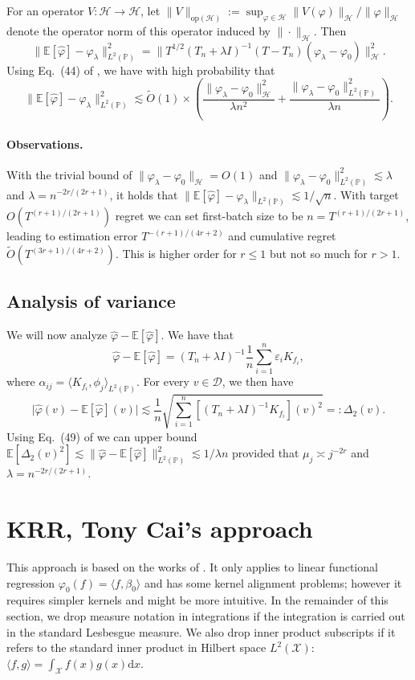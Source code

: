\documentclass[11pt,a4paper]{article}
\renewcommand{\hat}{\widehat}
\renewcommand{\tilde}{\widetilde}
\theoremstyle{definition}
\theoremstyle{plain}
\theoremstyle{remark}
\newcommand{\op}{\mathrm{op}}
\newcommand{\mX}{\mathcal X}
\newcommand{\mD}{\mathcal D}
\newcommand{\bP}{\mathbb P}
\newcommand{\lp}{L^2(\bP)}
\newcommand{\lx}{L^2(\mX)}
\newcommand{\ud}{\mathrm d}
\newcommand{\mH}{\mathcal H}
\begin{document}
For an operator $V:\mH\to\mH$, let $\|V\|_{\op(\mH)} := \sup_{\varphi\in\mH}\|V(\varphi)\|_\mH/\|\varphi\|_\mH$ denote the operator norm of this operator induced by $\|\cdot\|_{\mH}$. Then
$$
\|\mathbb E[\hat\varphi]-\varphi_\lambda\|_{\lp}^2 
= \|T^{1/2} (T_n+\lambda I)^{-1}(T-T_n)(\varphi_\lambda-\varphi_0)\|_{\mH}^2.
$$
Using Eq.~(44) of \cite{caponnetto2007optimal}, we have with high probability that 
$$
\|\mathbb E[\hat\varphi]-\varphi_\lambda\|_{\lp}^2  \lesssim \tilde O(1)\times \left(\frac{\|\varphi_\lambda-\varphi_0\|_{\mH}^2}{\lambda n^2} + \frac{\|\varphi_\lambda-\varphi_0\|_{\lp}^2}{\lambda n}\right).
$$

\paragraph{Observations.} With the trivial bound of $\|\varphi_\lambda-\varphi_0\|_{\mH}=O(1)$ and $\|\varphi_\lambda-\varphi_0\|_{\lp}^2 \lesssim \lambda$ and $\lambda =n^{-2r/(2r+1)}$, 
it holds that $\|\mathbb E[\hat\varphi]-\varphi_\lambda\|_{\lp} \lesssim 1/\sqrt{n}$. With target $O(T^{(r+1)/(2r+1)})$ regret we can set first-batch size to be $n = T^{(r+1)/(2r+1)}$, leading to
estimation error $T^{-(r+1)/(4r+2)}$ and cumulative regret $\tilde O(T^{(3r+1)/(4r+2)})$. This is higher order for $r\leq 1$ but not so much for $r>1$.


\subsection{Analysis of variance}

We will now analyze $\hat\varphi-\mathbb E[\hat\varphi]$. We have that
$$
\hat\varphi-\mathbb E[\hat\varphi] = (T_n+\lambda I)^{-1}\frac{1}{n}\sum_{i=1}^n \varepsilon_i K_{f_i},
$$
where $\alpha_{ij} = \langle K_{f_i},\phi_j\rangle_{\lp}$. For every $v\in\mD$, we then have
$$
\big|\hat\varphi(v) -\mathbb E[\hat\varphi](v)\big| \lesssim \frac{1}{n}\sqrt{\sum_{i=1}^n [(T_n+\lambda I)^{-1}K_{f_i}](v)^2}=: \Delta_2(v).
$$
Using Eq.~(49) of \cite{caponnetto2007optimal} we can upper bound $\mathbb E[\Delta_2(v)^2] \lesssim \|\hat\varphi-\mathbb E[\hat\varphi]\|_{\lp}^2\lesssim 1/\lambda n$ provided that $\mu_j\asymp j^{-2r}$ and 
$\lambda = n^{-2r/(2r+1)}$.

\section{KRR, Tony Cai's approach}

This approach is based on the works of \cite{yuan2010reproducing,cai2012minimax}. It only applies to linear functional regression $\varphi_0(f)=\langle f,\beta_0\rangle$ and has some kernel alignment problems;
however it requires simpler kernels and might be more intuitive. In the remainder of this section, we drop measure notation in integrations if the integration is carried out in the standard Lesbesgue measure. We also drop inner product subscripts if it refers to the standard inner product in Hilbert space $\lx$: $\langle f,g\rangle = \int_{\mX}f(x)g(x)\ud x$.
\end{document}

